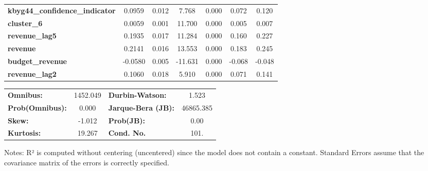 \begin{center}
\begin{tabular}{lcccccc}
\textbf{kbyg44\_confidence\_indicator}    &       0.0959  &        0.012     &     7.768  &         0.000        &        0.072    &        0.120     \\
\textbf{cluster\_6}                       &       0.0059  &        0.001     &    11.700  &         0.000        &        0.005    &        0.007     \\
\textbf{revenue\_lag5}                    &       0.1935  &        0.017     &    11.284  &         0.000        &        0.160    &        0.227     \\
\textbf{revenue}                          &       0.2141  &        0.016     &    13.553  &         0.000        &        0.183    &        0.245     \\
\textbf{budget\_revenue}                  &      -0.0580  &        0.005     &   -11.631  &         0.000        &       -0.068    &       -0.048     \\
\textbf{revenue\_lag2}                    &       0.1060  &        0.018     &     5.910  &         0.000        &        0.071    &        0.141     \\
\bottomrule
\end{tabular}
\begin{tabular}{lclc}
\textbf{Omnibus:}       & 1452.049 & \textbf{  Durbin-Watson:     } &     1.523  \\
\textbf{Prob(Omnibus):} &   0.000  & \textbf{  Jarque-Bera (JB):  } & 46865.385  \\
\textbf{Skew:}          &  -1.012  & \textbf{  Prob(JB):          } &      0.00  \\
\textbf{Kurtosis:}      &  19.267  & \textbf{  Cond. No.          } &      101.  \\
\bottomrule
\end{tabular}
\end{center}

Notes: \newline
 [1] R² is computed without centering (uncentered) since the model does not contain a constant. \newline
 [2] Standard Errors assume that the covariance matrix of the errors is correctly specified.